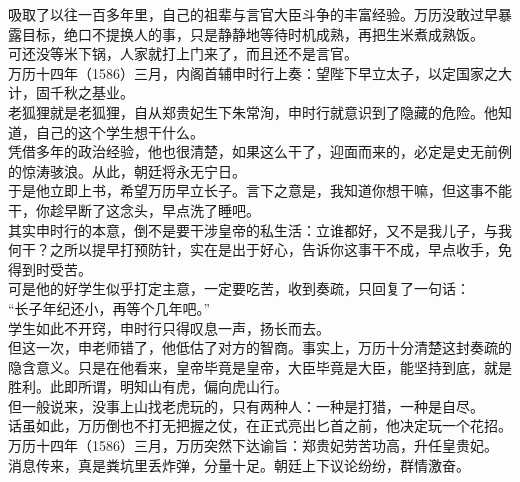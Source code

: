 \begin{multicols}{\theparacolNo}
吸取了以往一百多年里，自己的祖辈与言官大臣斗争的丰富经验。万历没敢过早暴露目标，绝口不提换人的事，只是静静地等待时机成熟，再把生米煮成熟饭。\\

可还没等米下锅，人家就打上门来了，而且还不是言官。\\

万历十四年（1586）三月，内阁首辅申时行上奏：望陛下早立太子，以定国家之大计，固千秋之基业。\\

老狐狸就是老狐狸，自从郑贵妃生下朱常洵，申时行就意识到了隐藏的危险。他知道，自己的这个学生想干什么。\\

凭借多年的政治经验，他也很清楚，如果这么干了，迎面而来的，必定是史无前例的惊涛骇浪。从此，朝廷将永无宁日。\\

于是他立即上书，希望万历早立长子。言下之意是，我知道你想干嘛，但这事不能干，你趁早断了这念头，早点洗了睡吧。\\

其实申时行的本意，倒不是要干涉皇帝的私生活：立谁都好，又不是我儿子，与我何干？之所以提早打预防针，实在是出于好心，告诉你这事干不成，早点收手，免得到时受苦。\\

可是他的好学生似乎打定主意，一定要吃苦，收到奏疏，只回复了一句话：\\

“长子年纪还小，再等个几年吧。”\\

学生如此不开窍，申时行只得叹息一声，扬长而去。\\

但这一次，申老师错了，他低估了对方的智商。事实上，万历十分清楚这封奏疏的隐含意义。只是在他看来，皇帝毕竟是皇帝，大臣毕竟是大臣，能坚持到底，就是胜利。此即所谓，明知山有虎，偏向虎山行。\\

但一般说来，没事上山找老虎玩的，只有两种人：一种是打猎，一种是自尽。\\

话虽如此，万历倒也不打无把握之仗，在正式亮出匕首之前，他决定玩一个花招。\\

万历十四年（1586）三月，万历突然下达谕旨：郑贵妃劳苦功高，升任皇贵妃。\\

消息传来，真是粪坑里丢炸弹，分量十足。朝廷上下议论纷纷，群情激奋。\\


\end{multicols}
